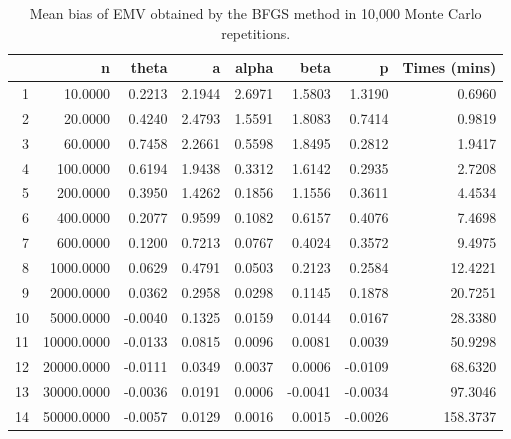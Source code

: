 \documentclass[12pt]{article}
\begin{document}
\thispagestyle{empty}
\begin{table}[ht]
\centering
\begin{tabular}{rrrrrrrr}
  \hline
 & n & theta & a & alpha & beta & p & Times (mins) \\ 
  \hline
1 & 10.0000 & 0.2213 & 2.1944 & 2.6971 & 1.5803 & 1.3190 & 0.6960 \\ 
  2 & 20.0000 & 0.4240 & 2.4793 & 1.5591 & 1.8083 & 0.7414 & 0.9819 \\ 
  3 & 60.0000 & 0.7458 & 2.2661 & 0.5598 & 1.8495 & 0.2812 & 1.9417 \\ 
  4 & 100.0000 & 0.6194 & 1.9438 & 0.3312 & 1.6142 & 0.2935 & 2.7208 \\ 
  5 & 200.0000 & 0.3950 & 1.4262 & 0.1856 & 1.1556 & 0.3611 & 4.4534 \\ 
  6 & 400.0000 & 0.2077 & 0.9599 & 0.1082 & 0.6157 & 0.4076 & 7.4698 \\ 
  7 & 600.0000 & 0.1200 & 0.7213 & 0.0767 & 0.4024 & 0.3572 & 9.4975 \\ 
  8 & 1000.0000 & 0.0629 & 0.4791 & 0.0503 & 0.2123 & 0.2584 & 12.4221 \\ 
  9 & 2000.0000 & 0.0362 & 0.2958 & 0.0298 & 0.1145 & 0.1878 & 20.7251 \\ 
  10 & 5000.0000 & -0.0040 & 0.1325 & 0.0159 & 0.0144 & 0.0167 & 28.3380 \\ 
  11 & 10000.0000 & -0.0133 & 0.0815 & 0.0096 & 0.0081 & 0.0039 & 50.9298 \\ 
  12 & 20000.0000 & -0.0111 & 0.0349 & 0.0037 & 0.0006 & -0.0109 & 68.6320 \\ 
  13 & 30000.0000 & -0.0036 & 0.0191 & 0.0006 & -0.0041 & -0.0034 & 97.3046 \\ 
  14 & 50000.0000 & -0.0057 & 0.0129 & 0.0016 & 0.0015 & -0.0026 & 158.3737 \\ 
   \hline
\end{tabular}
\caption{Mean bias of EMV obtained by the BFGS method in 10,000 Monte Carlo repetitions.} 
\end{table}
\end{document}
